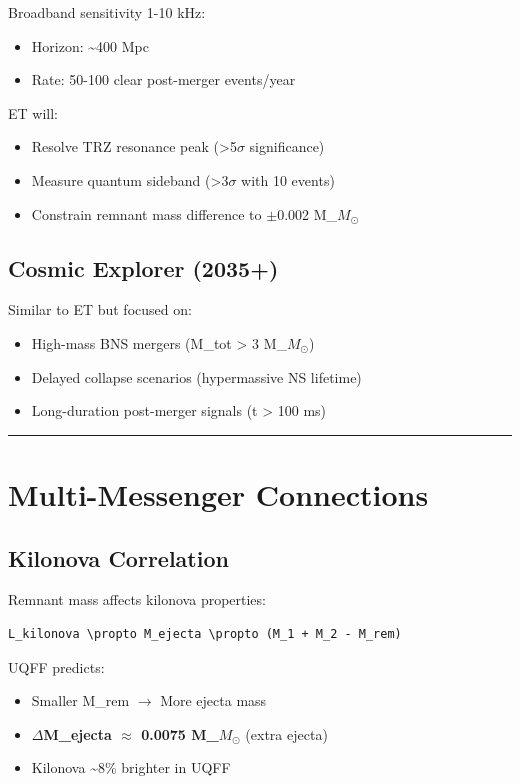 \documentclass[12pt,a4paper]{article}
\begin{document}
Broadband sensitivity 1-10 kHz:

\begin{itemize}
  \item Horizon: \textasciitilde{}400 Mpc
  \item Rate: 50-100 clear post-merger events/year
\end{itemize}

ET will:

\begin{itemize}
  \item Resolve TRZ resonance peak (>5$\sigma$ significance)
  \item Measure quantum sideband (>3$\sigma$ with 10 events)
  \item Constrain remnant mass difference to $\pm$0.002 M\_{$M_{\odot}$}
\end{itemize}

\subsection{Cosmic Explorer (2035+)}

Similar to ET but focused on:

\begin{itemize}
  \item High-mass BNS mergers (M\_tot > 3 M\_{$M_{\odot}$})
  \item Delayed collapse scenarios (hypermassive NS lifetime)
  \item Long-duration post-merger signals (t > 100 ms)
\end{itemize}

\medskip\hrule\medskip

\section{Multi-Messenger Connections}

\subsection{Kilonova Correlation}

Remnant mass affects kilonova properties:

\begin{verbatim}
L_kilonova \propto M_ejecta \propto (M_1 + M_2 - M_rem)
\end{verbatim}

UQFF predicts:

\begin{itemize}
  \item Smaller M\_rem $\to$ More ejecta mass
  \item \textbf{$\Delta$M\_ejecta $\approx$ 0.0075 M\_{$M_{\odot}$}} (extra ejecta)
  \item Kilonova \textasciitilde{}8\% brighter in UQFF
\end{itemize}
\end{document}
